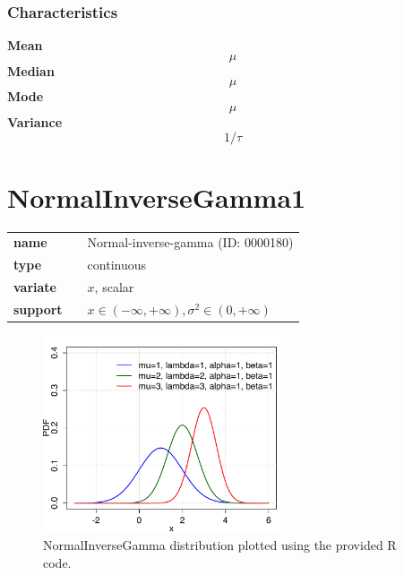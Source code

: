\subsubsection*{Characteristics}
\smallskip \noindent \hspace{.2cm} \textbf{Mean} 
\begin{equation*}\mu\end{equation*}
\smallskip \noindent \hspace{.2cm} \textbf{Median} 
\begin{equation*}\mu\end{equation*}
\smallskip \noindent \hspace{.2cm} \textbf{Mode} 
\begin{equation*}\mu\end{equation*}
\smallskip \noindent \hspace{.2cm} \textbf{Variance} 
\begin{equation*}1/\tau\end{equation*}
\smallskip
\section*{NormalInverseGamma1} 

  \bigskip 

\begin{tabular}{p{2cm}cl}
\textbf{name} & & Normal-inverse-gamma (ID: 0000180)\\ 
 
\textbf{type} & & continuous \\ 

\textbf{variate} & & $x$, scalar \\ 

\textbf{support} & & $x \in (-\infty,+\infty), \sigma^2 \in (0,+\infty)$
\end{tabular}

\begin{figure}[ht!]
\centering
  \includegraphics[width=70mm]{pics/NormalInverseGamma.pdf}
 \caption{NormalInverseGamma distribution plotted using the provided R code.}
 \label{fig:NormalInverseGamma}
\end{figure}

